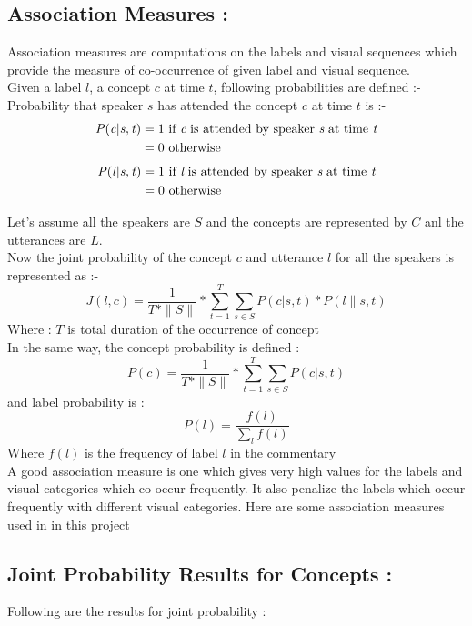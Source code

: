 \def\DevnagVersion{2.15}\documentclass[a4paper, 11pt, notitlepage]{report}
\begin{document}
\subsection{Association Measures :}

Association measures are computations on the labels and visual sequences which provide the measure of co-occurrence of given label and visual sequence.\\
Given a label $l$, a concept $c$ at time $t$, following probabilities are defined :-\\
Probability that speaker $s$ has attended the concept $c$ at time $t$ is :-\\
\begin{align*}
\mathit{P(c | s, t)}  &= 1 \text{ if {\it c} is attended by speaker {\it s}  at time {\it t}} \\
   &=  0 \text{ otherwise}
\end{align*}
\begin{align*}
\mathit{P(l | s, t)}  &= 1 \text{ if {\it l} is attended by speaker {\it s}  at time {\it t}} \\
   &=  0 \text{ otherwise}
\end{align*}
	
Let's assume all the speakers are $S$ and the concepts are represented by $C$ anl the utterances are $L$. \\
Now the joint probability of the concept $c$ and utterance $l$ for all the speakers is represented as :- 
$$J(l,c) = \frac{1}{T*\|S\|} * \sum_{t =1 } ^{T}{\sum_{s\in S}{P(c|s, t) *P(l\|s, t)}}$$
Where : $T$ is total duration of the occurrence of concept \\
In the same way, the concept probability is defined : \\
$$P(c) = \frac{1}{T*\|S\|} * \sum_{t =1 } ^{T}{\sum_{s\in S}{P(c|s, t)}}$$
and label probability is : 
$$P(l) = \frac{f(l)}{\sum_l f(l)}$$
Where $f(l)$ is the frequency of label $l$ in the commentary\\
A good association measure is one which gives very high values for the labels and visual categories which co-occur frequently. It also penalize the labels which occur frequently with different visual categories. Here are some association measures used in in this project\\

\subsection{Joint Probability Results for Concepts :} Following are the results for joint probability :\\
\end{document}
